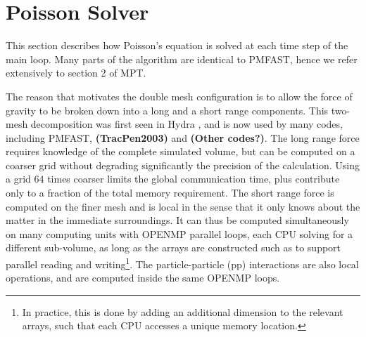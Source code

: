 \section{Poisson Solver}
\label{sec:Poisson}


This section describes how Poisson's equation is solved at each time step of the main loop. 
Many parts of the algorithm are identical to {\small PMFAST}, hence we refer extensively 
to section 2 of MPT.

The reason that motivates the double mesh configuration is to allow the force of gravity to be broken down into 
a long and a short range components. This two-mesh decomposition was first seen in Hydra \citep{hydra}, 
and is now used by many codes, including {\small PMFAST}, {\bf (TracPen2003)} and {\bf (Other codes?)}.
The long range force requires knowledge of the complete simulated volume, 
but can be computed on a coarser grid without degrading significantly the precision of the calculation.
Using a grid 64 times coarser limits the global communication time, plus contribute only to a fraction of the total memory requirement.
The short range force is computed on the finer mesh and is local in the sense that it only knows about the matter in the immediate surroundings.
It can thus be computed simultaneously on many computing units with {\small OPENMP} parallel loops, each {\small CPU} solving for a different sub-volume,
as long as the arrays are constructed such as to support parallel reading and writing\footnote{In practice, this is done by adding an additional dimension
to the relevant arrays, such that each {\small CPU} accesses a unique memory location.}. 
The particle-particle (pp) interactions are also local operations, and are computed inside the same {\small OPENMP} loops. 

